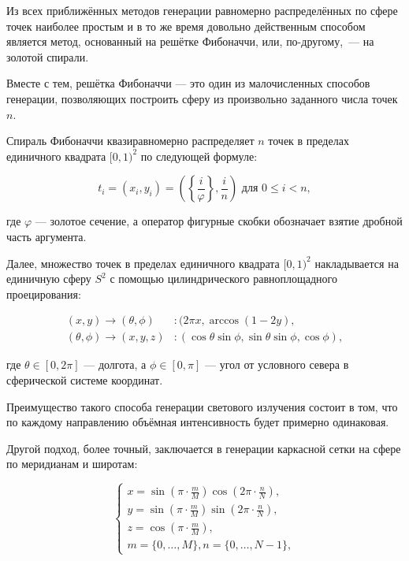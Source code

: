Из всех приближённых методов генерации равномерно распределённых по сфере точек наиболее простым и в то же время довольно действенным способом является метод, основанный на решётке Фибоначчи, или, по-другому,~— на золотой спирали.

Вместе с тем, решётка Фибоначчи — это один из малочисленных способов генерации, позволяющих построить сферу из произвольно заданного числа точек $n$.

Спираль Фибоначчи квазиравномерно распределяет $n$ точек в пределах единичного квадрата $[0, 1)^2$ по следующей формуле:

\begin{equation}
	t_i = (x_i, y_i) = \left(\left\{\frac{i}{\varphi}\right\}, \frac{i}{n}\right) \text{ для } 0 \leqslant i < n,
\end{equation}

\noindent где $\varphi$ — золотое сечение, а оператор фигурные скобки обозначает взятие дробной часть аргумента.

Далее, множество точек в пределах единичного квадрата $[0, 1)^2$ накладывается на единичную сферу $S^2$ с помощью цилиндрического равноплощадного проецирования:

\begin{align}
	(x, y) \to (\theta, \phi)&\colon (2 \pi x, \arccos{(1 - 2y)}, \\
	(\theta, \phi) \to (x, y, z)&\colon (\cos\theta \sin\phi, \sin\theta \sin\phi, \cos\phi),
\end{align}

\noindent где $\theta \in [0, 2\pi]$ — долгота, а $\phi \in [0, \pi]$ — угол от условного севера в сферической системе координат.

Преимущество такого способа генерации светового излучения состоит в том, что по каждому направлению объёмная интенсивность будет примерно одинаковая.

Другой подход, более точный, заключается в генерации каркасной сетки на сфере по меридианам и широтам:

\begin{equation}
	\begin{cases}
		x = \sin{\left(\pi \cdot \frac mM\right)}\cos{\left(2\pi \cdot \frac nN\right)}, \\
		y = \sin{\left(\pi \cdot \frac mM\right)}\sin{\left(2\pi \cdot \frac nN\right)}, \\
		z = \cos{\left(\pi \cdot \frac mM\right)}, \\
		m = \{0, \ldots, M\}, n = \{0, \ldots, N-1\},
	\end{cases}
\end{equation}

